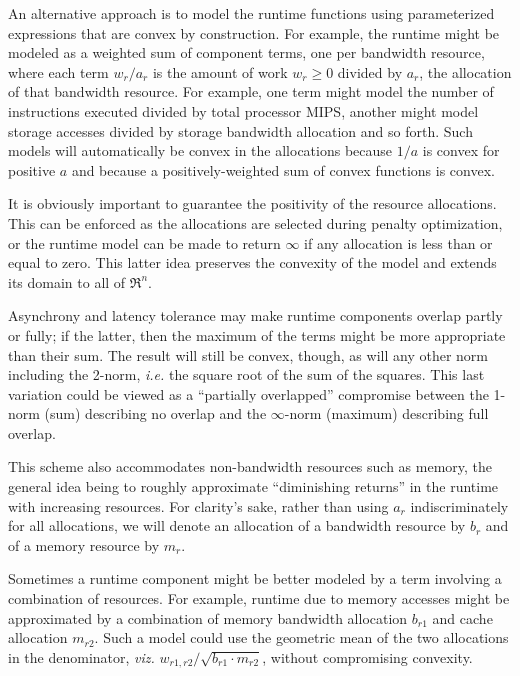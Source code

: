 An alternative approach is to model the runtime functions using parameterized expressions that are convex by construction.
For example, the runtime might be modeled as a weighted sum of component terms,
one per bandwidth resource, where each term $w_r/a_r$ is
the amount of work $w_r \geq 0$ divided by $a_r$, the allocation of that bandwidth resource\cite{Sn}.
For example,
one term might model the number of instructions executed divided by total processor MIPS,
another might model storage accesses divided by storage bandwidth allocation and so forth.
Such models will automatically be convex in the allocations because $1/a$ is convex for positive $a$
and because a positively-weighted sum of convex functions is convex.

It is obviously important to guarantee the positivity of the resource allocations.
This can be enforced as the allocations are selected during penalty optimization,
or the runtime model can be made to return $\infty$ if any allocation is less than or equal to zero.
This latter idea preserves the convexity of the model and extends its domain to all of $\Re^n$.

Asynchrony and latency tolerance may make runtime components overlap partly or fully;
if the latter, then the maximum of the terms might be more appropriate than their sum.
The result will still be convex, though, as will any other norm including the 2-norm,
\emph{i.e.} the square root of the sum of the squares.
This last variation could be viewed as a ``partially overlapped'' compromise between
the 1-norm (sum) describing no overlap and the $\infty$-norm (maximum) describing full overlap.

This scheme also accommodates non-bandwidth resources such as memory,
the general idea being to roughly approximate ``diminishing returns'' in the runtime with increasing resources.
For clarity's sake, rather than using $a_r$ indiscriminately for all allocations,
we will denote an allocation of a bandwidth resource by $b_r$ and of a memory resource by $m_r$.

Sometimes a runtime component might be better modeled by a term involving a combination of resources.
For example, runtime due to memory accesses might be approximated
by a combination of memory bandwidth allocation $b_{r1}$ and cache allocation $m_{r2}$.
Such a model could use the geometric mean of the two allocations in the denominator,
\emph{viz.} $w_{r1,r2}/\sqrt{b_{r1}\cdot m_{r2}}$, without compromising convexity.

